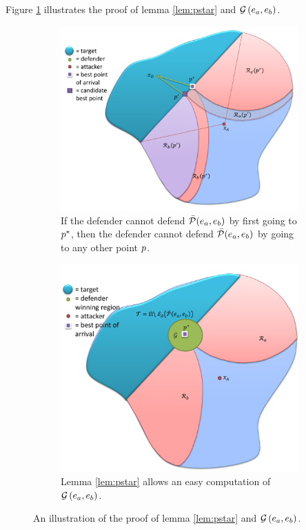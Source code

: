 Figure \ref{fig:lemma2} illustrates the proof of lemma \ref{lem:pstar} and $\mathcal{G}\left(e_a,e_b\right)$.
\begin{figure}[h]
\centering
	\centering
	\begin{subfigure}{0.45\textwidth}
	\includegraphics[width=\textwidth]{"fig/best point pstar"}
	\caption{If the defender cannot defend $\bar{\mathcal{P}}(e_a,e_b)$ by first going to $p^*$, then the defender cannot defend $\bar{\mathcal{P}}(e_a,e_b)$ by going to any other point $p$.}
	\end{subfigure} \quad
	\begin{subfigure}{0.45\textwidth}
	\centering
	\includegraphics[width=\textwidth]{"fig/defender winning pd"}
	\caption{Lemma \ref{lem:pstar} allows an easy computation of $\mathcal{G}\left(e_a,e_b\right)$.}
	\end{subfigure}
	\caption{An illustration of the proof of lemma \ref{lem:pstar} and $\mathcal{G}\left(e_a,e_b\right)$.}
	\label{fig:lemma2}
\end{figure}

